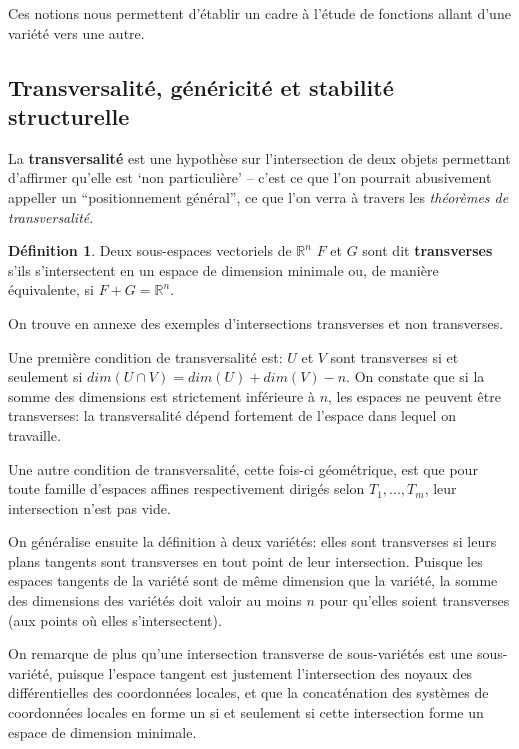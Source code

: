 \documentclass{article}
\newcommand{\R}{\mathbb{R}}
\theoremstyle{definition}
\newtheorem{defn}{Définition}
\begin{document}
Ces notions nous permettent d'établir un cadre à l'étude de fonctions allant d'une variété vers une autre.

\subsection{Transversalité, généricité et stabilité structurelle}

La \textbf{transversalité} est une hypothèse sur l'intersection de deux objets permettant d'affirmer qu'elle est `non particulière' -- c'est ce que l'on pourrait abusivement appeller un ``positionnement général'', ce que l'on verra à travers les \textit{théorèmes de transversalité}.

\begin{defn}
	Deux sous-espaces vectoriels de $\R^n$ $F$ et $G$ sont dit \textbf{transverses} s'ils s'intersectent en un espace de dimension minimale ou, de manière équivalente, si $F+G=\R^n$.

\end{defn}

On trouve en annexe des exemples d'intersections transverses et non transverses.

Une première condition de transversalité est: $U$ et $V$ sont transverses si et seulement si $dim(U\cap V)=dim(U)+dim(V)-n$.
On constate que si la somme des dimensions est strictement inférieure à $n$, les espaces ne peuvent être transverses: la transversalité dépend fortement de l'espace dans lequel on travaille.

Une autre condition de transversalité, cette fois-ci géométrique, est que pour toute famille d'espaces affines respectivement dirigés selon $T_1,...,T_m$, leur intersection n'est pas vide.

On généralise ensuite la définition à deux variétés: elles sont transverses si leurs plans tangents sont transverses en tout point de leur intersection.
Puisque les espaces tangents de la variété sont de même dimension que la variété, la somme des dimensions des variétés doit valoir au moins $n$ pour qu'elles soient transverses (aux points où elles s'intersectent).

On remarque de plus qu'une intersection transverse de sous-variétés est une sous-variété, puisque l'espace tangent est justement l'intersection des noyaux des différentielles des coordonnées locales, et que la concaténation des systèmes de coordonnées locales en forme un si et seulement si cette intersection forme un espace de dimension minimale.
\end{document}
